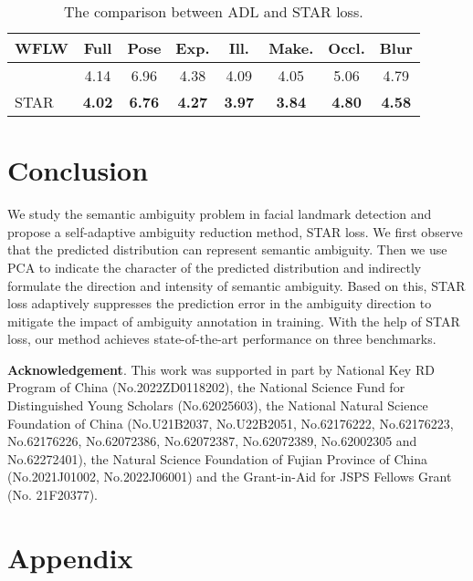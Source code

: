 \documentclass[10pt,twocolumn,letterpaper]{article}
\begin{document}
\begin{table}[t]
\footnotesize
\centering
\begin{tabular}{l|ccccccc}
WFLW         & Full & Pose & Exp. & Ill. & Make. & Occl. & Blur \\
\hline
\cite{huang2021adnet} & 4.14 & 6.96 & 4.38 & 4.09  & 4.05    & 5.06   & 4.79 \\
STAR & \textbf{4.02} & \textbf{6.76} & \textbf{4.27} & \textbf{3.97}  & \textbf{3.84} & \textbf{4.80} & \textbf{4.58} \\
\end{tabular}\vspace{-1.0em}
\caption{The comparison between ADL and STAR loss. 
}
\vspace{-0.5em}
\label{tab: abl-adnet}
\end{table}

\section{Conclusion}

We study the semantic ambiguity problem in facial landmark detection and propose a self-adaptive ambiguity reduction method, STAR loss.
We first observe that the predicted distribution can represent semantic ambiguity.
Then we use PCA to indicate the character of the predicted distribution and indirectly formulate the direction and intensity of semantic ambiguity.
Based on this, STAR loss adaptively suppresses the prediction error in the ambiguity direction to mitigate the impact of ambiguity annotation in training.
With the help of STAR loss, our method achieves state-of-the-art performance on three benchmarks.


\textbf{Acknowledgement}.
This work was supported in part by National Key RD Program of China (No.2022ZD0118202), the National Science Fund for Distinguished Young Scholars (No.62025603), the National Natural Science Foundation of China (No.U21B2037, No.U22B2051, No.62176222, No.62176223, No.62176226, No.62072386, No.62072387, No.62072389, No.62002305 and No.62272401), the Natural Science Foundation of Fujian Province of China (No.2021J01002,  No.2022J06001) and the Grant-in-Aid for JSPS Fellows Grant (No. 21F20377).

{\small


}

\newpage
\onecolumn
\section*{\hfil {\LARGE Appendix}\hfil}
\end{document}
